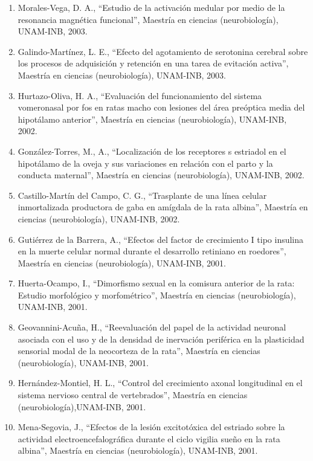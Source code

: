 \begin{enumerate}
\item Morales-Vega, D. A., “Estudio de la activación medular por medio de la resonancia magnética funcional”, Maestría en ciencias (neurobiología), 
UNAM-INB, 2003.

\item 
Galindo-Martínez, L. E., “Efecto del agotamiento de serotonina cerebral sobre los procesos de adquisición y retención en una tarea de evitación 
activa”, 
Maestría en ciencias (neurobiología), UNAM-INB, 2003.

\item Hurtazo-Oliva, H. A., “Evaluación del funcionamiento del sistema vomeronasal por fos en ratas macho con lesiones del área preóptica media del 
hipotálamo 
anterior”, Maestría en ciencias (neurobiología), UNAM-INB, 2002.

\item González-Torres, M., A., “Localización de los receptores s estriadol en el hipotálamo de la oveja y sus variaciones en relación con el parto y la 
conducta 
maternal”, Maestría en ciencias (neurobiología), UNAM-INB, 2002.

\item Castillo-Martín del Campo, C. G., “Trasplante de una línea celular inmortalizada productora de gaba en amígdala de la rata albina”, Maestría en 
ciencias 
(neurobiología), UNAM-INB, 2002.

\item Gutiérrez de la Barrera, A., “Efectos del factor de crecimiento I tipo insulina en la muerte celular normal durante el desarrollo retiniano en 
roedores”, 
Maestría en ciencias (neurobiología), UNAM-INB, 2001.

\item Huerta-Ocampo, I., “Dimorfismo sexual en la comisura anterior de la rata: Estudio morfológico y morfométrico”, Maestría en ciencias (neurobiología), 
UNAM-INB, 2001.

\item Geovannini-Acuña, H., “Reevaluación del papel de la actividad neuronal asociada con el uso y de la densidad de inervación periférica en la plasticidad 
sensorial modal de la neocorteza de la rata”, Maestría en ciencias (neurobiología), UNAM-INB, 2001.

\item Hernández-Montiel, H. L., “Control del crecimiento axonal longitudinal en el sistema nervioso central de vertebrados”, Maestría en ciencias 
(neurobiología),UNAM-INB, 2001.

\item Mena-Segovia, J., “Efectos de la lesión excitotóxica del estriado sobre la actividad electroencefalográfica durante el ciclo vigilia sueño en la rata 
albina”, Maestría en ciencias (neurobiología), UNAM-INB, 2001.


\end{enumerate}
